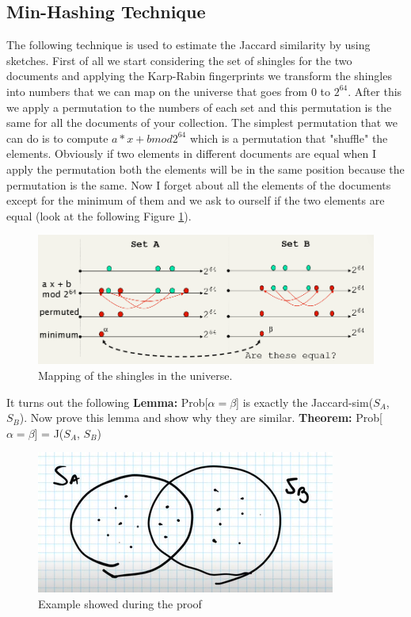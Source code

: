 \subsection{Min-Hashing Technique}
The following technique is used to estimate the Jaccard similarity by using sketches. First of all we start considering the set of shingles for the two documents and applying the Karp-Rabin fingerprints we transform the shingles into numbers that we can map on the universe that goes from 0 to $2^{64}$. After this we apply a permutation to the numbers of each set and this permutation is the same for all the documents of your collection. The simplest permutation that we can do is to compute $a*x+b mod 2^{64}$ which is a permutation that "shuffle" the elements. Obviously if two elements in different documents are equal when I apply the permutation both the elements will be in the same position because the permutation is the same. Now I forget about all the elements of the documents except for the minimum of them and we ask to ourself if the two elements are equal (look at the following Figure \ref{fig:mappingmin}).\newline
\begin{figure}
    \centering
    \includegraphics[width=0.75\linewidth]{images/mappingminhash.png}
    \caption{Mapping of the shingles in the universe.}
    \label{fig:mappingmin}
\end{figure}
It turns out the following \textbf{Lemma:} Prob[$\alpha = \beta$] is exactly the Jaccard-sim($S_A$, $S_B$). Now prove this lemma and show why they are similar.\newline
\textbf{Theorem:} Prob[$\alpha = \beta$] = J($S_A$, $S_B$)
\begin{figure}
    \centering
    \includegraphics[width=0.75\linewidth]{images/theoremproof.png}
    \caption{Example showed during the proof}
    \label{fig:theoremproof}
\end{figure}
